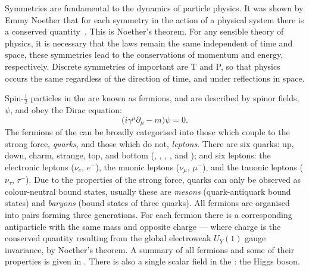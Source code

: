Symmetries are fundamental to the dynamics of particle physics.
It was shown by Emmy Noether that for each symmetry in the action of a physical system there is a
conserved quantity~\cite{Noether}.
This is Noether's theorem.
For any sensible theory of physics, it is necessary that the laws remain the same independent of
time and space, these symmetries lead to the conservations of momentum and energy, respectively.
Discrete symmetries of important are \gls{T} and \gls{P}, so that physics occurs the same
regardless of the direction of time, and under reflections in space.


Spin-$\tfrac12$ particles in the \sm are known as fermions, and
are described by spinor fields, $\psi$, and obey the Dirac equation:
\begin{equation}
  \big(i\gamma^\mu\partial_\mu - m\big)\psi = 0.
  \label{th:eq:dirac}
\end{equation}
The fermions of the \sm can be broadly categorised into those which couple to the strong force,
\emph{quarks}, and those which do not, \emph{leptons}.
There are six quarks: up, down, charm, strange, top, and bottom (\uquark, \dquark, \cquark,
\squark, \tquark and \bquark); and six leptons:
the electronic leptons ($\nu_e$, $e^-$),
the muonic leptons ($\nu_\mu$, $\mu^-$),
and the tauonic leptons ($\nu_\tau$, $\tau^-$).
Due to the properties of the strong force, quarks can only be observed as colour-neutral bound
states, usually these are
\emph{mesons} (quark-antiquark bound states) and \emph{baryons} (bound states of three quarks).
All fermions are organised into pairs forming three generations.
For each fermion there is a corresponding antiparticle with the same mass and opposite charge ---
where charge is the conserved quantity resulting from the global electroweak $U_Y(1)$ gauge
invariance, by Noether's theorem.
A summary of all fermions and some of their properties is given in .
There is also a single scalar field in the \sm: the Higgs boson.

